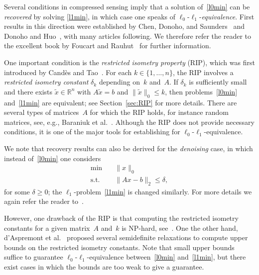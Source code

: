 \documentclass[a4paper,11pt,1p]{elsarticle}
\newcommand{\Norm}[2]{\lVert{#1}\rVert_{#2}}
\newcommand{\R}{\mathds{R}}
\begin{document}
%


Several conditions in compressed sensing imply that a solution
of~\eqref{l0min} can be \emph{recovered} by solving \eqref{l1min}, in which
case one speaks of $\ell_0$-$\ell_1$-\emph{equivalence}. First results in
this direction were established by Chen, Donoho, and
Saunders~\cite{CheDS99} and Donoho and Huo~\cite{DH01}, with many articles
following. We therefore refer the reader to the excellent book by Foucart
and Rauhut~\cite{FouR13} for further information.

One important condition is the \emph{restricted isometry property} (RIP),
which was first introduced by Cand\`es and Tao~\cite{CT05}. For each $k \in
\{1, \dots, n\}$, the RIP involves a \emph{restricted isometry constant}
$\delta_k$ depending on~$k$ and~$A$. If $\delta_k$ is sufficiently small
and there exists $\tilde{x} \in \R^n$ with $A \tilde{x} = b$ and
$\Norm{\tilde{x}}{0} \leq k$, then problems~\eqref{l0min} and~\eqref{l1min}
are equivalent; see Section~\ref{sec:RIP} for more details. There are
several types of matrices~$A$ for which the RIP holds, for instance random
matrices, see, e.g., Baraniuk et al.~\cite{BDDW08}. Although the RIP does
not provide necessary conditions, it is one of the major tools for
establishing for $\ell_0$-$\ell_1$-equivalence.

We note that recovery results can also be derived for the \emph{denoising}
case, in which instead of~\eqref{l0min} one considers
\begin{align}\label{l0minDenoising}
  \min \quad & \Norm{x}{0} \tag{$P_0^\delta$}\\
  \text{s.t.} \quad & \Norm{Ax - b}{2} \leq \delta, \nonumber
\end{align}
for some $\delta \geq 0$; the $\ell_1$-problem~\eqref{l1min} is changed
similarly. For more details we again refer the reader to~\cite{FouR13}.

However, one drawback of the RIP is that computing the restricted isometry
constants for a given matrix~$A$ and~$k$ is NP-hard, see~\cite{PT14}. One
the other hand, d'Aspremont et al.~\cite{Asp07,Asp08} proposed several
semidefinite relaxations to compute upper bounds on the restricted isometry
constants. Note that small upper bounds suffice to guarantee
$\ell_0$-$\ell_1$-equivalence between~\eqref{l0min} and~\eqref{l1min}, but
there exist cases in which the bounds are too weak to give a guarantee.
\end{document}
